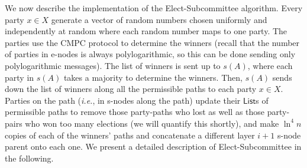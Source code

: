 \documentclass[11pt,letter]{article}
\newcommand{\ie}{\emph{i.e.}}
\theoremstyle{mytheoremstyle}
\newcommand{\hw}{\mbox{\textsf{CMPC}}\xspace}
\newcommand{\lst}{\ensuremath{\mathsf{List}}}
\newcommand{\es}{\mbox{\textsf{Elect-Subcommittee}}\xspace}
\begin{document}
We now describe the implementation of the \es algorithm. Every party $x\in X$  generate a vector of random numbers chosen uniformly and independently at random where each random number maps to one party. The parties use the \hw protocol to determine the winners 
(recall that the number of parties in \textsf{e-node}s is always polylogarithmic, so this can be done sending only polylogarithmic messages). The list of winners is sent up to $s(A)$, where each party in $s(A)$ takes a majority to determine the winners. Then, $s(A)$ sends down the list of winners along all the permissible paths to each party $x\in X$.
Parties on the path (\ie, in \textsf{s-node}s along the path) update their \lst s of permissible paths to remove those party-paths who lost as well as those party-pairs who won too many elections (we will quantify this shortly), and make $\ln^4 n$ copies of each of the winners' paths and concatenate a different layer $i +1$ \textsf{s-node} parent onto each one. We present a detailed description of \es in the following.
\end{document}
